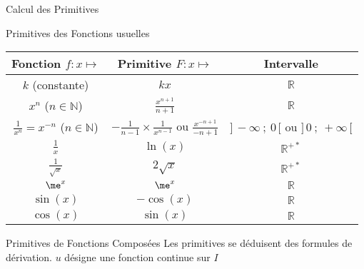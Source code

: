 \documentclass{cours}
\begin{document}
    \begin{Gpartie}{Calcul des Primitives} 
        \begin{Spartie}{Primitives des Fonctions usuelles} 
            \begin{center}\begin{tabular}[c]{ @{}*{3}{C}@{} } \toprule
                Fonction $f:x\mapsto$                       & Primitive $F:x\mapsto$                                            & Intervalle  \\ \midrule
                $k$ (constante)                             & $kx$                                                              & $\mathbb{R}$ \\ 
                $x^n$ ($n\in\mathbb{N}$)                    & $\frac{x^{n+1}}{n+1}$                                             & $\mathbb{R}$ \\ 
                $\frac{1}{x^n}=x^{-n}$ ($n\in\mathbb{N}$)   & $-\frac{1}{n-1}\times\frac{1}{x^{n-1}}$ ou $\frac{x^{-n+1}}{-n+1}$& $\big]\,-\infty~;~0\,\big[$ ou $\big]\,0~;~+\infty\,\big[$ \\ 
                $\frac{1}{x}$                               & $\ln(x)$                                                          & $\mathbb{R^{+*}}$ \\ 
                $\frac{1}{\sqrt{x}}$                        & $2\sqrt{x}$                                                       & $\mathbb{R^{+*}}$ \\ 
                $\me^x$                                       & $\me^x$                                                             & $\mathbb{R}$ \\ 
                $\sin(x)$                                   & $-\cos(x)$                                                        & $\mathbb{R}$ \\ 
                $\cos(x)$                                   & $\sin(x)$                                                         & $\mathbb{R}$ \\ \bottomrule
            \end{tabular}\end{center}
            \parbox{\linewidth}{}
        \end{Spartie}
        \begin{Spartie}{Primitives de Fonctions Composées}
            Les primitives se déduisent des formules de dérivation. $u$ désigne une fonction continue sur $I$ \vspace{2ex}

\end{Spartie}
\end{Gpartie}
\end{document}
